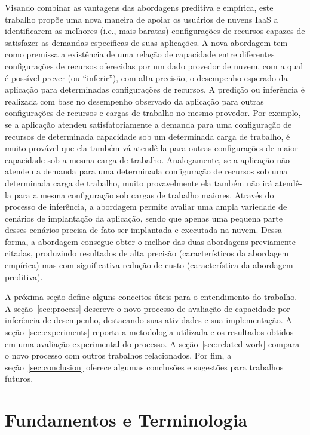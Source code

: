 \documentclass[12pt]{article}
\begin{document}
Visando combinar as vantagens das abordagens preditiva e empírica, este trabalho propõe uma nova maneira de apoiar os usuários de nuvens IaaS a identificarem as melhores (i.e., mais baratas) configurações de recursos capazes de satisfazer as demandas específicas de suas aplicações. A nova abordagem tem como premissa a existência de uma relação de capacidade entre diferentes configurações de recursos oferecidas por um dado provedor de nuvem, com a qual é possível prever (ou ``inferir''), com alta precisão, o desempenho esperado da aplicação para determinadas configurações de recursos. A predição ou inferência é realizada com base no desempenho observado da aplicação para outras configurações de recursos e cargas de trabalho no mesmo provedor. Por exemplo, se a aplicação atendeu satisfatoriamente a demanda para uma configuração de recursos de determinada capacidade sob um determinada carga de trabalho, é muito provável que ela também vá atendê-la para outras configurações de maior capacidade sob a mesma carga de trabalho. Analogamente, se a aplicação não atendeu a demanda para uma determinada configuração de recursos sob uma determinada carga de trabalho, muito provavelmente ela também não irá atendê-la para a mesma configuração sob cargas de trabalho maiores. Através do processo de inferência, a abordagem permite avaliar uma ampla variedade de cenários de implantação da aplicação, sendo que apenas uma pequena parte desses cenários precisa de fato ser implantada e executada na nuvem. Dessa forma, a abordagem consegue obter o melhor das duas abordagens previamente citadas, produzindo resultados de alta precisão (característicos da abordagem empírica) mas com significativa redução de custo (característica da abordagem preditiva).

A próxima seção define alguns conceitos úteis para o entendimento do trabalho. A seção~\ref{sec:process} descreve o novo processo de avaliação de capacidade por inferência de desempenho, destacando suas atividades e sua implementação. A seção~\ref{sec:experiments} reporta a metodologia utilizada e os resultados obtidos em uma avaliação experimental do processo. A seção~\ref{sec:related-work} compara o novo processo com outros trabalhos relacionados. Por fim, a seção~\ref{sec:conclusion} oferece algumas conclusões e sugestões para trabalhos futuros.

\section{Fundamentos e Terminologia}\label{sec:background}
\end{document}
